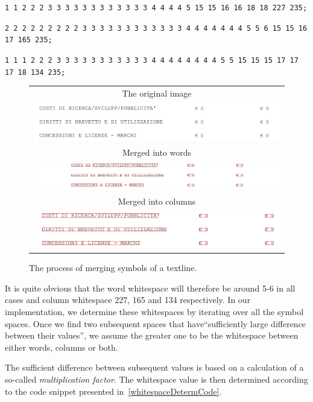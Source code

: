 \texttt{1 1 2 2 2 3 3 3 3 3 3 3 3 3 3 3 3 4 4 4 4 5 15 15 16 16 18 18 227 235;}

\texttt{2 2 2 2 2 2 2 2 2 3 3 3 3 3 3 3 3 3 3 3 3 4 4 4 4 4 4 4 5 5 6 15 15 16 17 165 235;}

\texttt{1 1 1 2 2 2 3 3 3 3 3 3 3 3 3 3 3 4 4 4 4 4 4 4 4 5 5 15 15 15 17 17 17 18 134 235;}

\begin{figure}
\centering
{\sffamily
\begin{tabular}{c}
The original image \\
\includegraphics[width=0.8\linewidth]{img/implementation/mergedOrig.jpg}\\
Merged into words \\
\includegraphics[width=0.8\linewidth]{img/implementation/mergedWords.png}\\
Merged into columns \\
\includegraphics[width=0.8\linewidth]{img/implementation/mergedCols.png}\\
\end{tabular}
}
\caption{The process of merging symbols of a textline.}
\label{fig:symbolMerging}
\end{figure}

It is quite obvious that the word whitespace will therefore be around 5-6 in all cases and column whitespace 227, 165 and 134 respectively. In our implementation, we determine these whitespaces by iterating over all the symbol spaces. Once we find two subsequent spaces that have``sufficiently large difference between their values'', we assume the greater one to be the whitespace between either words, columns or both.

The sufficient difference between subsequent values is based on a calculation of a so-called \emph{multiplication factor}. The whitespace value is then determined according to the code snippet presented in~\cref{whitespaceDetermCode}.

